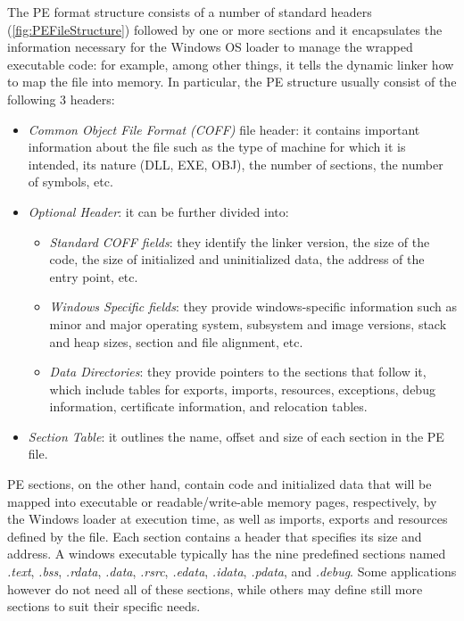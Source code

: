 \documentclass[pdfa%
,cucitura%
]{toptesi}
\begin{document}
The PE format structure consists of a number of standard headers (\ref{fig:PEFileStructure}) followed by one or more sections and it encapsulates the information necessary for the Windows OS loader to manage the wrapped executable code: for example, among other things, it tells the dynamic linker how to map the file into memory. In particular, the PE structure usually consist of the following 3 headers:
\begin{itemize}
	\item \textit{Common Object File Format (COFF)} file header: it contains important information about the file such as the type of machine for which it is intended, its nature (DLL, EXE, OBJ), the number of sections, the number of symbols, etc.
	
	\item \textit{Optional Header}: it can be further divided into:
	\begin{itemize}
		\item \textit{Standard COFF fields}: they identify the linker version, the size of the code, the size of initialized and uninitialized data, the address of the entry point, etc.
		
		\item \textit{Windows Specific fields}: they provide windows-specific information such as minor and major operating system, subsystem and image versions, stack and heap sizes, section and file alignment, etc.
		
		\item \textit{Data Directories}: they provide pointers to the sections that follow it, which include tables for exports, imports, resources, exceptions, debug information, certificate information, and relocation tables.
	\end{itemize}
	
	\item \textit{Section Table}: it outlines the name, offset and size of each section in the PE file.
\end{itemize}

PE sections, on the other hand, contain code and initialized data that will be mapped into executable or readable/write-able memory pages, respectively, by the Windows loader at execution time, as well as imports, exports and resources defined by the file. Each section contains a header that specifies its size and address. A windows executable typically has the nine predefined sections named \textit{.text}, \textit{.bss}, \textit{.rdata}, \textit{.data}, \textit{.rsrc}, \textit{.edata}, \textit{.idata}, \textit{.pdata}, and \textit{.debug}. Some applications however do not need all of these sections, while others may define still more sections to suit their specific needs.
\end{document}

